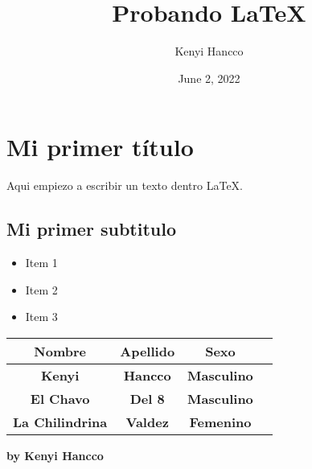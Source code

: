 \documentclass{article}
\title{Probando \LaTeX}
\author{Kenyi Hancco}
\date{June 2, 2022}
\begin{document}
    \section{Mi primer título}
    Aqui empiezo a escribir un texto dentro \LaTeX. 

    \subsection{Mi primer subtitulo}
    \begin{itemize}
        \item Item 1
        \item Item 2
        \item Item 3
    \end{itemize}

    \begin{table}[h]
        \centering
        \begin{tabular}{|c|c|c|c|}
            \hline
            \textbf{Nombre} & \textbf{Apellido} & \textbf{Sexo} \\
            \hline
            \textbf{Kenyi} & \textbf{Hancco} & \textbf{Masculino} \\
            \hline
            \textbf{El Chavo} & \textbf{Del 8} & \textbf{Masculino} \\
            \hline
            \textbf{La Chilindrina} & \textbf{Valdez} & \textbf{Femenino} \\
            \hline
        \end{tabular}
    \end{table}

    \begin{flushright}
        \textbf{by Kenyi Hancco}
    \end{flushright}
    
\end{document}

